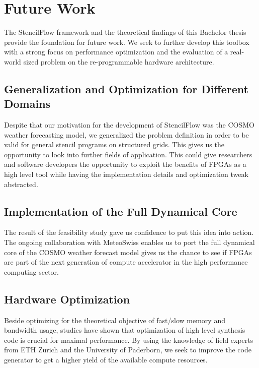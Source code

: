 \chapter{Future Work}

The StencilFlow framework and the theoretical findings of this Bachelor thesis provide the foundation for future work. We seek to further develop this toolbox with a strong focus on performance optimization and the evaluation of a real-world sized problem on the re-programmable hardware architecture.


\section{Generalization and Optimization for Different Domains}
Despite that our motivation for the development of StencilFlow was the COSMO weather forecasting model, we generalized the problem definition in order to be valid for general stencil programs on structured grids. This gives us the opportunity to look into further fields of application. This could give researchers and software developers the opportunity to exploit the benefits of FPGAs as a high level tool while having the implementation details and optimization tweak abstracted.


\section{Implementation of the Full Dynamical Core}
The result of the feasibility study gave us confidence to put this idea into action. The ongoing collaboration with MeteoSwiss enables us to port the full dynamical core of the COSMO weather forecast model gives us the chance to see if FPGAs are part of the next generation of compute accelerator in the high performance computing sector. 


\section{Hardware Optimization}
Beside optimizing for the theoretical objective of fast/slow memory and bandwidth usage, studies \cite{label4,label5,label18,label33,label30} have shown that optimization of high level synthesis code is crucial for maximal performance. By using the knowledge of field experts from ETH Zurich and the University of Paderborn, we seek to improve the code generator to get a higher yield of the available compute resources.


